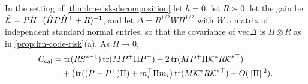 \begin{corollary}\label{cor:lrn-calibration-cost}
In the setting of \cref{thm:lrn-risk-decomposition} let $h=0$, let $R\succ0$, let the gain be $\hat{\mathcal{K}}=P\hat H^\top(\hat HP\hat H^\top+R)^{-1}$, and let $\Delta=R^{1/2}W\Pi^{1/2}$ with $W$ a matrix of independent standard normal entries, so that the covariance of $\mathrm{vec}\Delta$ is $\Pi\otimes R$ as in \cref{prop:lrn-code-risk}(a). As $\Pi\to0$,
\begin{equation}\label{eq:lrn-calibration-cost}
\begin{aligned}
C_{\mathrm{cal}}&=\operatorname{tr}(RS^{\ast-1})\operatorname{tr}(MP^+\Pi P^+)-2\operatorname{tr}(MP^+\Pi\mathcal{K}^\ast R\mathcal{K}^{\ast\top})\\
&\quad+\bigl(\operatorname{tr}((P-P^+)\Pi)+m_i^\top\Pi m_i\bigr)\operatorname{tr}(M\mathcal{K}^\ast R\mathcal{K}^{\ast\top})+O(\Vert\Pi\Vert^2).
\end{aligned}
\end{equation}
\end{corollary}

